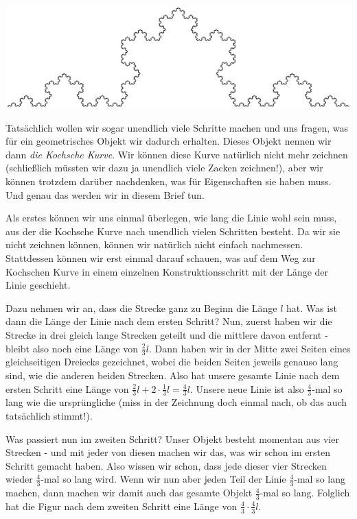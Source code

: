\documentclass[a4paper,ngerman,12pt]{scrartcl}
\theoremstyle{definition}
\theoremstyle{plain}
\theoremstyle{remark}
\begin{document}
\begin{center}
	\includegraphics[width=.5\textwidth]{Bilder/Schneeflocke-Konstruktion3.pdf}
\end{center}

Tatsächlich wollen wir sogar \glqq unendlich viele\grqq{} Schritte machen und uns fragen, was für ein geometrisches Objekt wir dadurch erhalten. Dieses Objekt nennen wir dann \emph{die Kochsche Kurve}. Wir können diese Kurve natürlich nicht mehr zeichnen (schließlich müssten wir dazu ja unendlich viele Zacken zeichnen!), aber wir können trotzdem darüber nachdenken, was für Eigenschaften sie haben muss. Und genau das werden wir in diesem Brief tun. 

Als erstes können wir uns einmal überlegen, wie lang die Linie wohl sein muss, aus der die Kochsche Kurve \glqq nach unendlich vielen Schritten\grqq{} besteht. Da wir sie nicht zeichnen können, können wir natürlich nicht einfach nachmessen. Stattdessen können wir erst einmal darauf schauen, was auf dem Weg zur Kochschen Kurve in einem einzelnen Konstruktionsschritt mit der Länge der Linie geschieht.

Dazu nehmen wir an, dass die Strecke ganz zu Beginn die Länge $l$ hat. Was ist dann die Länge der Linie nach dem ersten Schritt? Nun, zuerst haben wir die Strecke in drei gleich lange Strecken geteilt und die mittlere davon entfernt - bleibt also noch eine Länge von $\frac{2}{3}l$. Dann haben wir in der Mitte zwei Seiten eines gleichseitigen Dreiecks gezeichnet, wobei die beiden Seiten jeweils genauso lang sind, wie die anderen beiden Strecken. Also hat unsere gesamte Linie nach dem ersten Schritt eine Länge von $\frac{2}{3}l + 2\cdot\frac{1}{3}l = \frac{4}{3}l$. Unsere neue Linie ist also $\frac{4}{3}$-mal so lang wie die ursprüngliche (miss in der Zeichnung doch einmal nach, ob das auch tatsächlich stimmt!).

Was passiert nun im zweiten Schritt? Unser Objekt besteht momentan aus vier Strecken - und mit jeder von diesen machen wir das, was wir schon im ersten Schritt gemacht haben. Also wissen wir schon, dass jede dieser vier Strecken wieder $\frac{4}{3}$-mal so lang wird. Wenn wir nun aber jeden Teil der Linie $\frac{4}{3}$-mal so lang machen, dann machen wir damit auch das gesamte Objekt $\frac{4}{3}$-mal so lang. Folglich hat die Figur nach dem zweiten Schritt eine Länge von $\frac{4}{3}\cdot\frac{4}{3}l$. 
\end{document}
